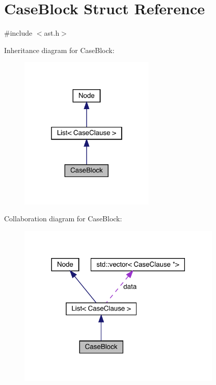 \hypertarget{struct_case_block}{}\section{Case\+Block Struct Reference}
\label{struct_case_block}


{\ttfamily \#include $<$ast.\+h$>$}



Inheritance diagram for Case\+Block\+:
\nopagebreak
\begin{figure}[H]
\begin{center}
\leavevmode
\includegraphics[width=183pt]{struct_case_block__inherit__graph}
\end{center}
\end{figure}


Collaboration diagram for Case\+Block\+:
\nopagebreak
\begin{figure}[H]
\begin{center}
\leavevmode
\includegraphics[width=276pt]{struct_case_block__coll__graph}
\end{center}
\end{figure}
